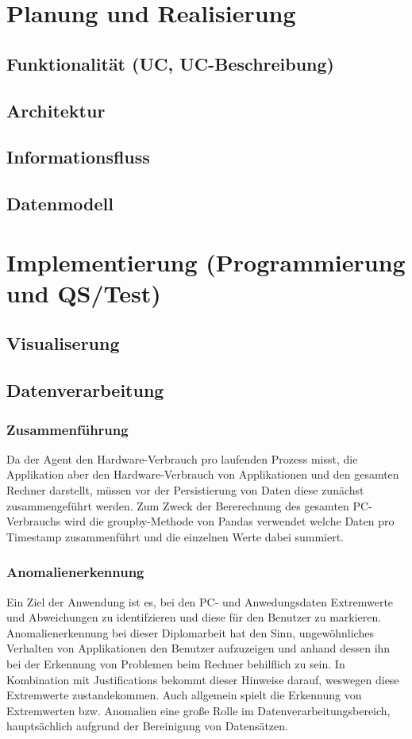 \documentclass{report}
\begin{document}
\chapter{Planung und Realisierung}
\section{Funktionalität (UC, UC-Beschreibung)}
\section{Architektur}
\section{Informationsfluss}
\section{Datenmodell}

\chapter{Implementierung (Programmierung und QS/Test)}
\section{Visualiserung}
\section{Datenverarbeitung}
\subsection{Zusammenführung}
Da der Agent den Hardware-Verbrauch pro laufenden Prozess misst, die Applikation aber den Hardware-Verbrauch von Applikationen und den gesamten Rechner darstellt, müssen vor der Persistierung von Daten diese zunächst zusammengeführt werden. Zum Zweck der Bererechnung des gesamten PC-Verbrauchs wird die groupby-Methode von Pandas verwendet welche Daten pro Timestamp zusammenführt und die einzelnen Werte dabei summiert.
\subsection{Anomalienerkennung}
Ein Ziel der Anwendung ist es, bei den PC- und Anwedungsdaten Extremwerte und Abweichungen zu identifzieren und diese für den Benutzer zu markieren. Anomalienerkennung bei dieser Diplomarbeit hat den Sinn, ungewöhnliches Verhalten von Applikationen den Benutzer aufzuzeigen und anhand dessen ihn bei der Erkennung von Problemen beim Rechner behilflich zu sein. In Kombination mit Justifications bekommt dieser Hinweise darauf, weswegen diese Extremwerte zustandekommen. Auch allgemein spielt die Erkennung von Extremwerten bzw. Anomalien eine große Rolle im Datenverarbeitungsbereich, hauptsächlich aufgrund der Bereinigung von Datensätzen.
\end{document}
